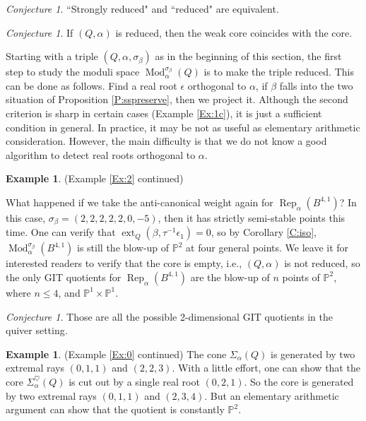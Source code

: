 \documentclass{amsart}
\theoremstyle{definition}
\newtheorem{example}[theorem]{Example}
\theoremstyle{remark}
\newtheorem{conjecture}[theorem]{Conjecture}
\numberwithin{equation}{section}
\begin{document}
\begin{conjecture} ``Strongly reduced" and ``reduced" are equivalent.
\end{conjecture}

\begin{conjecture} If $(Q,\alpha)$ is reduced, then the weak core coincides with the core.
\end{conjecture}

Starting with a triple $(Q,\alpha,\sigma_\beta)$ as in the beginning of this section, the first step to study the moduli space ${\operatorname{Mod}}_\alpha^{\sigma_\beta}(Q)$ is to make the triple reduced. This can be done as follows. Find a real root $\epsilon$ orthogonal to $\alpha$, if $\beta$ falls into the two situation of Proposition \ref{P:sspreserve}, then we project it. Although the second criterion is sharp in certain cases (Example \ref{Ex:1c}), it is just a sufficient condition in general. In practice, it may be not as useful as elementary arithmetic consideration. However, the main difficulty is that we do not know a good algorithm to detect real roots orthogonal to $\alpha$.

\begin{example} \label{Ex:2c} (Example \ref{Ex:2} continued)

What happened if we take the anti-canonical weight again for ${\operatorname{Rep}}_\alpha(B^{4,1})$? In this case, $\sigma_\beta=(2,2,2,2,2,0,-5)$, then it has strictly semi-stable points this time. One can verify that ${\operatorname{ext}}_Q(\beta,\tau^{-1}\epsilon_1)=0$, so by Corollary \ref{C:iso}, ${\operatorname{Mod}}_\alpha^{\sigma_\beta}(B^{4,1})$ is still the blow-up of ${\mathbb{{P}}}^2$ at four general points. We leave it for interested readers to verify that the core is empty, i.e., $(Q,\alpha)$ is not reduced, so the only GIT quotients for ${\operatorname{Rep}}_\alpha(B^{4,1})$ are the blow-up of $n$ points of ${\mathbb{{P}}}^2$, where $n\leqslant 4$, and ${\mathbb{{P}}}^1\times{\mathbb{{P}}}^1$.
\begin{conjecture}
Those are all the possible 2-dimensional GIT quotients in the quiver setting.
\end{conjecture}
\end{example}

\begin{example} \label{Ex:0c} (Example \ref{Ex:0} continued) The cone $\Sigma_\alpha(Q)$ is generated by two extremal rays $(0,1,1)$ and $(2,2,3)$. With a little effort, one can show that the core $\Sigma_\alpha^\heartsuit(Q)$ is cut out by a single real root $(0,2,1)$. So the core is generated by two extremal rays $(0,1,1)$ and $(2,3,4)$. But an elementary arithmetic argument can show that the quotient is constantly ${\mathbb{{P}}}^2$.
\end{example}
\end{document}
